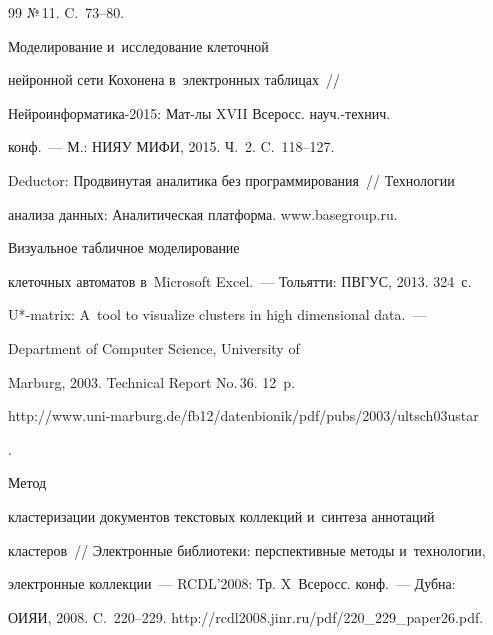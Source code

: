 {{\begin{thebibliography}{99}
№\,11. C.~73--80.




 Моделирование и~исследование клеточной 


нейронной сети Кохонена в~электронных таблицах~/\!\!/  


Ней\-ро\-ин\-фор\-ма\-ти\-ка-2015: Мат-лы XVII Всеросс. науч.-технич.  


конф.~--- М.: НИЯУ МИФИ, 2015. Ч.~2. C.~118--127.




Deductor: Продвинутая аналитика без программирования~/\!\!/ Технологии 


анализа данных: Аналитическая платформа. {\sf www.basegroup.ru}.




 Визуальное табличное моделирование 


клеточных автоматов в~Microsoft Excel.~--- Тольятти: ПВГУС, 2013. 324~с.







 U*-matrix: A~tool to visualize clusters in high dimensional data.~--- 


Department of Computer Science, University of 


Marburg, 2003. Technical Report No.\,36. 12~p.


{\sf  


http://www.uni-marburg.de/fb12/datenbionik/pdf/pubs/2003/ultsch03ustar}.







 Метод 


кластеризации документов текстовых коллекций и~синтеза аннотаций 


кластеров~/\!\!/ Электронные библиотеки: перспективные методы и~технологии, 


электронные коллекции~--- RCDL'2008: Тр. X~Всеросс. конф.~--- Дубна: 


ОИЯИ, 2008. C.~220--229. {\sf http://rcdl2008.jinr.ru/pdf/220\_229\_paper26.pdf}.





     \end{thebibliography}


} }








